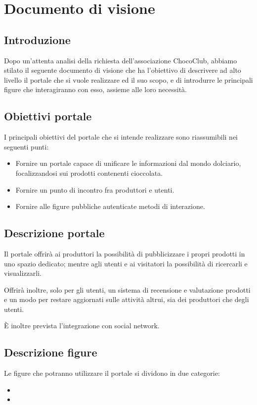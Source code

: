 \chapter{Documento di visione} 
\label{cha:documento_di_visione}

\section{Introduzione}
\label{sec:introduzione}
Dopo un'attenta analisi della richiesta dell'associazione ChocoClub, abbiamo stilato il seguente documento di visione che ha l'obiettivo di descrivere ad alto livello il portale che si vuole realizzare ed il suo scopo, e di introdurre le principali figure che interagiranno con esso, assieme alle loro necessità.

\section{Obiettivi portale} 
\label{sec:descrizione_portale}
I principali obiettivi del portale che si intende realizzare sono riassumibili nei seguenti punti:
\begin{itemize}
	\item Fornire un portale capace di unificare le informazioni dal mondo dolciario, focalizzandosi sui prodotti contenenti cioccolata.
	\item Fornire un punto di incontro fra produttori e utenti.
	\item Fornire alle figure pubbliche autenticate metodi di interazione.
\end{itemize}

\section{Descrizione portale}
\label{sec:descrizione_portale}
Il portale offrirà ai produttori la possibilità di pubblicizzare i propri prodotti in uno spazio dedicato; mentre agli utenti e ai visitatori la possibilità di ricercarli e visualizzarli. 

Offrirà inoltre, solo per gli utenti, un sistema di recensione e valutazione prodotti e un modo per restare aggiornati sulle attività altrui, sia dei produttori che degli utenti.

È inoltre prevista l'integrazione con social network.

\section{Descrizione figure} 
\label{sec:descrizione_figure}
Le figure che potranno utilizzare il portale si dividono in due categorie:
\begin{itemize}
	\item {}
	\item {}
\end{itemize}

